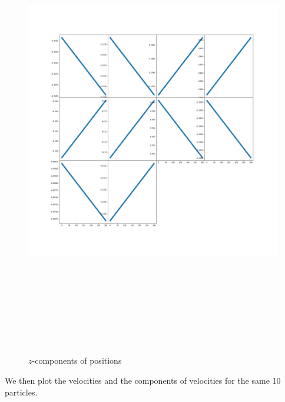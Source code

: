 \documentclass[12pt]{article}
\begin{document}
	\begin{figure}[H]
		\includegraphics[width=\linewidth, height=20cm]{subpsz3Bz.png} \caption{$z$-components of positions} \label{subpsz3Bz}
	\end{figure}
	\noindent We then plot the velocities and the components of velocities for the same 10 particles.
\end{document}
